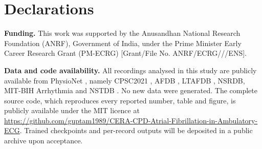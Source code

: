 \documentclass[preprint,12pt]{elsarticle}
\newcommand{\1}{\mathbf{1}}
\begin{document}
\section*{Declarations}
\noindent\textbf{Funding.} This work was supported by the Anusandhan National Research Foundation (ANRF), Government of India, under the Prime Minister Early Career Research Grant (PM-ECRG) [Grant/File No. ANRF/\allowbreak ECRG///\allowbreak ENS].

\noindent\textbf{Data and code availability.} All recordings analysed in this study are publicly available from PhysioNet \cite{goldberger2000physionet}, namely CPSC2021 \cite{cpsc2021}, AFDB \cite{moody1983afdb}, LTAFDB \cite{petrutiu2007ltafdb}, NSRDB, MIT-BIH Arrhythmia \cite{moody2001mitbih} and NSTDB \cite{moody1984nstdb}. No new data were generated. The complete source code, which reproduces every reported number, table and figure, is publicly available under the MIT licence at \url{https://github.com/guptam1989/CERA-CPD-Atrial-Fibrillation-in-Ambulatory-ECG}. Trained checkpoints and per-record outputs will be deposited in a public archive upon acceptance.



\end{document}
